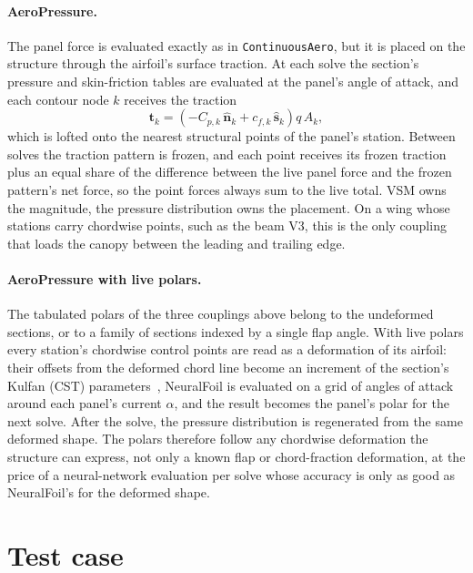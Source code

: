 \documentclass[11pt,a4paper]{article}
\newcommand{\code}[1]{\texttt{#1}}
\newcommand{\vect}[1]{\boldsymbol{#1}}
\begin{document}
\paragraph{AeroPressure.} The panel force is evaluated exactly as in \code{ContinuousAero}, but it is placed on the structure through the airfoil's surface traction. At each solve the section's pressure and skin-friction tables are evaluated at the panel's angle of attack, and each contour node $k$ receives the traction
\begin{equation}
  \vect{t}_k = \left( -C_{p,k}\,\hat{\vect{n}}_k + c_{f,k}\,\hat{\vect{s}}_k \right)
               q\, A_k ,
\end{equation}
which is lofted onto the nearest structural points of the panel's station. Between solves the traction pattern is frozen, and each point receives its frozen traction plus an equal share of the difference between the live panel force and the frozen pattern's net force, so the point forces always sum to the live total. VSM owns the magnitude, the pressure distribution owns the placement. On a wing whose stations carry chordwise points, such as the beam V3, this is the only coupling that loads the canopy between the leading and trailing edge.

\paragraph{AeroPressure with live polars.} The tabulated polars of the three couplings above belong to the undeformed sections, or to a family of sections indexed by a single flap angle. With live polars every station's chordwise control points are read as a deformation of its airfoil: their offsets from the deformed chord line become an increment of the section's Kulfan (CST) parameters~\citep{kulfan2008}, NeuralFoil is evaluated on a grid of angles of attack around each panel's current $\alpha$, and the result becomes the panel's polar for the next solve. After the solve, the pressure distribution is regenerated from the same deformed shape. The polars therefore follow any chordwise deformation the structure can express, not only a known flap or chord-fraction deformation, at the price of a neural-network evaluation per solve whose accuracy is only as good as NeuralFoil's for the deformed shape.

\section{Test case}
\end{document}
